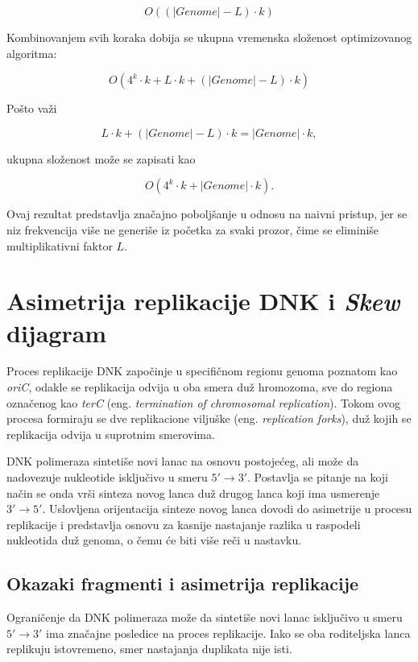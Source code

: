 \documentclass[12pt,oneside]{memoir}
\begin{document}
\[
O((|Genome| - L)\cdot k)
\]




Kombinovanjem svih koraka dobija se ukupna vremenska složenost optimizovanog algoritma:

\[
O(4^k \cdot k + L\cdot k + (|Genome| - L)\cdot k)
\]

Pošto važi

\[
L \cdot k + (|Genome| - L)\cdot k
=
|Genome| \cdot k,
\]

ukupna složenost može se zapisati kao

\[
O(4^k \cdot k + |Genome|\cdot k).
\]

Ovaj rezultat predstavlja značajno poboljšanje u odnosu na naivni pristup, jer se niz frekvencija više ne generiše iz početka za svaki prozor, čime se eliminiše multiplikativni faktor $L$.




\section{Asimetrija replikacije DNK i \textit{Skew} dijagram}

Proces replikacije DNK započinje u specifičnom regionu genoma poznatom kao \textit{oriC}, odakle se replikacija odvija u oba smera duž hromozoma, sve do regiona označenog kao \textit{terC} (eng.\textit{ termination of chromosomal replication}). Tokom ovog procesa formiraju se dve replikacione viljuške (eng. \textit{replication forks}), duž kojih se replikacija odvija u suprotnim smerovima.

DNK polimeraza sintetiše novi lanac na osnovu postojećeg, ali može da nadovezuje nukleotide isključivo u smeru $5' \rightarrow 3'$. Postavlja se pitanje na koji način se onda vrši sinteza novog lanca duž drugog lanca koji ima usmerenje $3' \rightarrow 5'$. Uslovljena orijentacija sinteze novog lanca dovodi do asimetrije u procesu replikacije i predstavlja osnovu za kasnije nastajanje razlika u raspodeli nukleotida duž genoma, o čemu će biti više reči u nastavku.



\subsection{Okazaki fragmenti i asimetrija replikacije}



Ograničenje da DNK polimeraza može da sintetiše novi lanac isključivo u smeru $5' \rightarrow 3'$ ima značajne posledice na proces replikacije. Iako se oba roditeljska lanca replikuju istovremeno, smer nastajanja duplikata nije isti.
\end{document}
